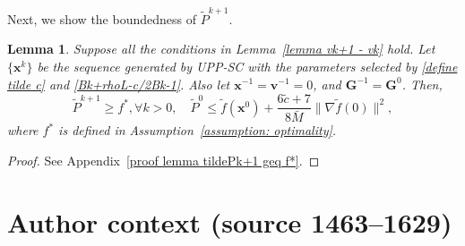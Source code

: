 \documentclass[10pt,a4paper]{amsart}
\newtheorem{lemma}{Lemma}
\begin{document}
Next, we show the boundedness of $\tilde{P}^{k+1}$.
\begin{lemma}\label{lemma tildePk+1 geq f*}
	Suppose all the conditions in Lemma~\ref{lemma vk+1 - vk} hold. Let $\{\mathbf{x}^k\}$ be the sequence generated by UPP-SC with the parameters selected by \eqref{define tilde c} and \eqref{Bk+rhoL-c/2Bk-1}. Also let $\mathbf{x}^{-1}=\mathbf{v}^{-1}=0$, and $\mathbf{G}^{-1}=\mathbf{G}^0$. Then,
	\begin{equation*}
		\tilde{P}^{k+1}\geq f^*, \forall k >0, \quad \tilde{P}^{0}\leq \tilde{f}(\mathbf{x}^0)+\frac{6\tilde{c}+7}{8\bar{M}}\|\nabla \tilde{f}(0)\|^2,
	\end{equation*}
	where $f^*$ is defined in Assumption~\ref{assumption: optimality}.
\end{lemma}

\begin{proof}
	See Appendix~\ref{proof lemma tildePk+1 geq f*}.
\end{proof}



\section*{Author context (source 1463--1629)}
\end{document}
